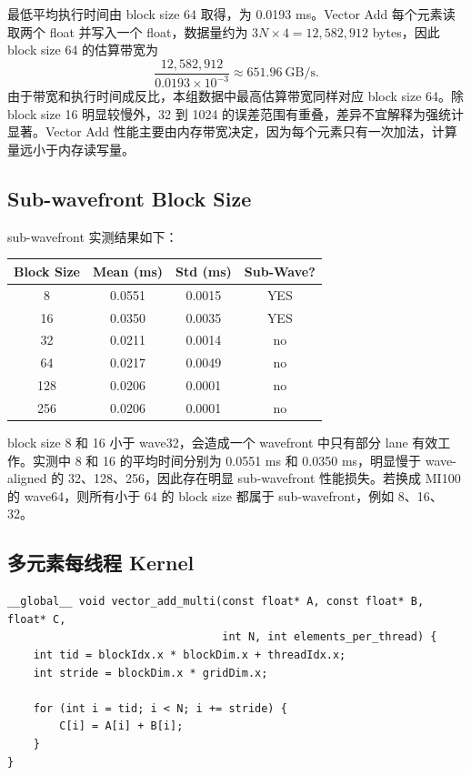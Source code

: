 \documentclass[UTF8,a4paper,12pt,fontset=none]{ctexart}
\begin{document}
最低平均执行时间由 block size 64 取得，为 0.0193 ms。Vector Add 每个元素读取两个 float 并写入一个 float，数据量约为 $3N\times4=12,582,912$ bytes，因此 block size 64 的估算带宽为
\[
  \frac{12,582,912}{0.0193\times10^{-3}}\approx 651.96\ \text{GB/s}.
\]
由于带宽和执行时间成反比，本组数据中最高估算带宽同样对应 block size 64。除 block size 16 明显较慢外，32 到 1024 的误差范围有重叠，差异不宜解释为强统计显著。Vector Add 性能主要由内存带宽决定，因为每个元素只有一次加法，计算量远小于内存读写量。

\subsection{Sub-wavefront Block Size}

sub-wavefront 实测结果如下：

\begin{center}
\begin{tabular}{cccc}
\toprule
Block Size & Mean (ms) & Std (ms) & Sub-Wave? \\
\midrule
8   & 0.0551 & 0.0015 & YES \\
16  & 0.0350 & 0.0035 & YES \\
32  & 0.0211 & 0.0014 & no \\
64  & 0.0217 & 0.0049 & no \\
128 & 0.0206 & 0.0001 & no \\
256 & 0.0206 & 0.0001 & no \\
\bottomrule
\end{tabular}
\end{center}

block size 8 和 16 小于 wave32，会造成一个 wavefront 中只有部分 lane 有效工作。实测中 8 和 16 的平均时间分别为 0.0551 ms 和 0.0350 ms，明显慢于 wave-aligned 的 32、128、256，因此存在明显 sub-wavefront 性能损失。若换成 MI100 的 wave64，则所有小于 64 的 block size 都属于 sub-wavefront，例如 8、16、32。

\subsection{多元素每线程 Kernel}

\begin{lstlisting}
__global__ void vector_add_multi(const float* A, const float* B, float* C,
                                 int N, int elements_per_thread) {
    int tid = blockIdx.x * blockDim.x + threadIdx.x;
    int stride = blockDim.x * gridDim.x;

    for (int i = tid; i < N; i += stride) {
        C[i] = A[i] + B[i];
    }
}
\end{lstlisting}
\end{document}
